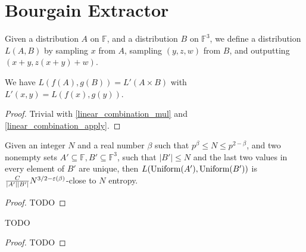 \chapter{Bourgain Extractor}
\label{chap:bourgain}

\begin{definition}
    \label{lapply}
    \leanok
    Given a distribution $A$ on $\mathbb{F}$, and a distribution $B$ on $\mathbb{F}^3$, we define a distribution $L(A, B)$
    by sampling $x$ from $A$, sampling $(y, z, w)$ from $B$, and outputting
    $(x + y, z(x + y) + w)$.
\end{definition}

\begin{lemma}
    \label{lapply_linear_combination}
    \leanok
    We have $L(f(A), g(B)) = L'(A\times B)$ with $L'(x, y) = L(f(x), g(y))$.
\end{lemma}

\begin{proof}
    \leanok
    Trivial with \ref{linear_combination_mul} and \ref{linear_combination_apply}.
\end{proof}

\begin{theorem}
    \label{line_point_large_l2_aux}
    \leanok
    Given an integer $N$ and a real number $\beta$ such that $p^\beta \leq N \leq p^{2 - \beta}$, and
    two nonempty sets $A' \subseteq \mathbb{F}, B'\subseteq \mathbb{F}^3$, such that $|B'| \leq N$ and 
    the last two values in every element of $B'$ are unique, then
    $L(\operatorname{\operatorname{Uniform}}(A'), \operatorname{\operatorname{Uniform}}(B'))$ is $\frac{C}{|A'| |B'|} N^{3/2 - \operatorname{\varepsilon}(\beta)}$-close to $N$ entropy.
\end{theorem}

\begin{proof}
    \leanok
    TODO
\end{proof}

\begin{theorem}
    \label{line_point_large_l2t}
    \leanok
    TODO
\end{theorem}

\begin{proof}
    \leanok
    TODO
\end{proof}

